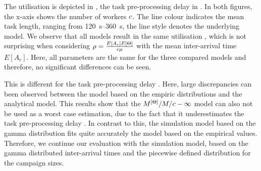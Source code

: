 The utilisation \workerUtilization is depicted in , the task pre-processing delay \preTaskProcessingDelay in .
In both figures, the x-axis shows the number of workers \(c\).
The line colour indicates the mean task length, ranging from \SIrange{120}{360}{\second}, the line style denotes the underlying model.
We observe that all models result in the same utilisation \workerUtilization, which is not surprising when considering \(\rho = \frac{E[A_c] E[\Theta]}{c\mu}\) with the mean inter-arrival time \(E[A_c]\).
Here, all parameters are the same for the three compared models and therefore, no significant differences can be seen.

This is different for the task pre-processing delay \preTaskProcessingDelay.
Here, large discrepancies can been observed between the model based on the empiric distributions and the analytical model.
This results show that the \(M^{[\Theta]}/M/c-\infty\) model can also not be used as a worst case estimation, due to the fact that it underestimates the task pre-processing delay \preTaskProcessingDelay.
In contrast to this, the simulation model based on the gamma distribution fits quite accurately the model based on the empirical values.
Therefore, we continue our evaluation with the simulation model, based on the gamma distributed inter-arrival times and the piecewise defined distribution for the campaign sizes.
